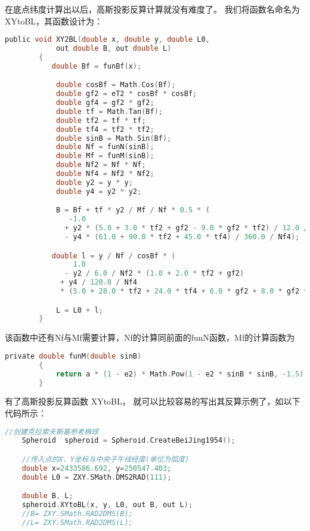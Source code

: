  在底点纬度计算出以后，高斯投影反算计算就没有难度了。
 我们将函数名命名为 XYtoBL，其函数设计为：
 \begin{lstlisting}[language=C]
        public void XY2BL(double x, double y, double L0,
            out double B, out double L)
        {
           double Bf = funBf(x);

            double cosBf = Math.Cos(Bf);
            double gf2 = eT2 * cosBf * cosBf;
            double gf4 = gf2 * gf2;
            double tf = Math.Tan(Bf);
            double tf2 = tf * tf;
            double tf4 = tf2 * tf2;
            double sinB = Math.Sin(Bf);
            double Nf = funN(sinB);
            double Mf = funM(sinB);
            double Nf2 = Nf * Nf;
            double Nf4 = Nf2 * Nf2;
            double y2 = y * y;
            double y4 = y2 * y2;

            B = Bf + tf * y2 / Mf / Nf * 0.5 * (
               -1.0
              + y2 * (5.0 + 3.0 * tf2 + gf2 - 9.0 * gf2 * tf2) / 12.0 / Nf2
              - y4 * (61.0 + 90.0 * tf2 + 45.0 * tf4) / 360.0 / Nf4);

           double l = y / Nf / cosBf * (
                1.0
              - y2 / 6.0 / Nf2 * (1.0 + 2.0 * tf2 + gf2)
             + y4 / 120.0 / Nf4
             * (5.0 + 28.0 * tf2 + 24.0 * tf4 + 6.0 * gf2 + 8.0 * gf2 * tf2));

            L = L0 + l;
        }
\end{lstlisting}

该函数中还有Nf与Mf需要计算，Nf的计算同前面的funN函数，Mf的计算函数为
 \begin{lstlisting}[language=C]
        private double funM(double sinB)
        {
            return a * (1 - e2) * Math.Pow(1 - e2 * sinB * sinB, -1.5);
        }
\end{lstlisting}

 有了高斯投影反算函数 XYtoBL， 就可以比较容易的写出其反算示例了，如以下代码所示：

\begin{lstlisting}[language=C]
     //创建克拉索夫斯基参考椭球
    Spheroid  spheroid = Spheroid.CreateBeiJing1954();

    //传入点的X、Y坐标与中央子午线经度(单位为弧度)
    double x=2433586.692, y=250547.403;
    double L0 = ZXY.SMath.DMS2RAD(111);

    double B, L;
    spheroid.XYtoBL(x, y, L0, out B, out L);
    //B= ZXY.SMath.RAD2DMS(B);
    //L= ZXY.SMath.RAD2DMS(L);
\end{lstlisting}

